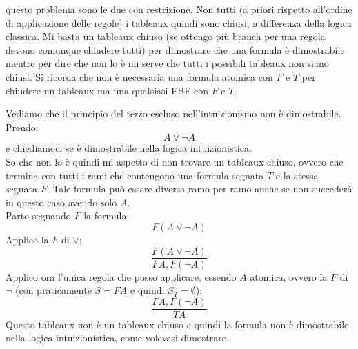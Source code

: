 \documentclass[a4paper,12pt, oneside]{book}
\begin{document}
questo problema sono le due con restrizione. Non tutti (a priori rispetto
all'ordine di applicazione delle regole) i tableaux quindi sono
chiusi, a differenza della logica classica. Mi basta un tableaux chiuso (se
ottengo più branch per una regola devono comunque chiudere tutti) per
dimostrare che una formula è dimostrabile mentre per dire che non lo è mi serve
che tutti i possibili tableaux non siano chiusi. Si ricorda che non è necessaria
una formula atomica con $F$ e $T$ per chiudere un tableaux ma una qualsiasi FBF
con $F$ e $T$.
\begin{esempio}
  Vediamo che il principio del terzo escluso nell'intuizionismo non è
  dimostrabile.\\
  Prendo:
  \[A\lor \neg A\]
  e chiediamoci se è dimostrabile nella logica intuizionistica.\\
  So che non lo è quindi mi aspetto di non trovare un tableaux chiuso, ovvero
  che termina con tutti i rami che contengono una formula segnata $T$ e la stessa
  segnata $F$. Tale formula può essere diversa ramo per ramo anche se non
  succederà in questo caso avendo solo $A$.\\
  Parto segnando $F$ la formula:
  \[F(A\lor \neg A)\]
  Applico la $F$ di $\lor$:
  \[\frac{F(A\lor \neg A)}{FA,F(\neg A)}\]
  Applico ora l'unica regola che posso applicare, essendo $A$ atomica, ovvero
  la $F$ di $\neg$ (con praticamente $S=FA$ e quindi $S_T=\emptyset$):
  \[\frac{FA,F(\neg A)}{TA}\]
  Questo tableaux non è un tableaux chiuso e quindi la formula non è
  dimostrabile nella logica intuizionistica, come volevasi dimostrare.
\end{esempio}
\end{document}
